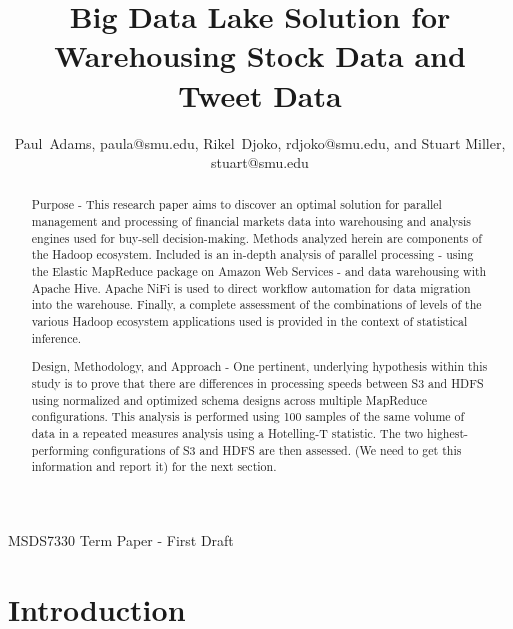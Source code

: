 \documentclass[journal]{IEEEtran}
\begin{document}
	
	\title{Big Data Lake Solution for\\ 
		Warehousing Stock Data and Tweet Data}
	
	\author{Paul~Adams, paula@smu.edu,
		Rikel~Djoko, rdjoko@smu.edu,
		and Stuart Miller, stuart@smu.edu}%
	
	{MSDS7330 Term Paper - First Draft}
	
	\maketitle
	
	\begin{abstract}
		
		Purpose - This research paper aims to discover an optimal solution for parallel management and processing of financial markets data into  warehousing and analysis engines used for buy-sell decision-making. Methods analyzed herein are components of the Hadoop ecosystem. Included is an in-depth analysis of parallel processing - using the Elastic MapReduce package on Amazon Web Services - and data warehousing with Apache Hive. Apache NiFi is used to direct workflow automation for data migration into the warehouse. Finally, a complete assessment of the combinations of levels of the various Hadoop ecosystem applications used is provided in the context of statistical inference.
		
		Design, Methodology, and Approach - One pertinent, underlying hypothesis within this study is to prove that there are differences in processing speeds between S3 and HDFS using normalized and optimized schema designs across multiple MapReduce configurations. This analysis is performed using 100 samples of the same volume of data in a repeated measures analysis using a Hotelling-T statistic. The two highest-performing configurations of S3 and HDFS are then assessed. (We need to get this information and report it) for the next section.
		
	\end{abstract}
	
	\section{Introduction}
	
\end{document}
